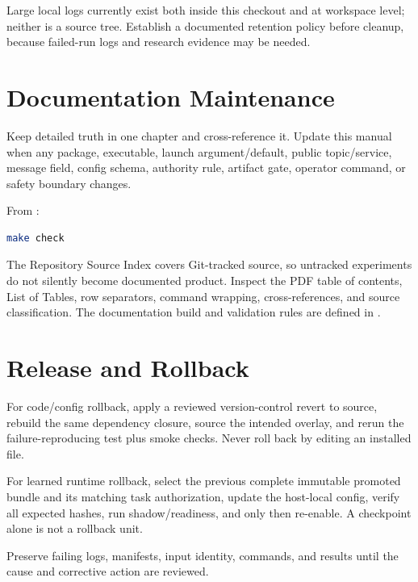 Large local logs currently exist both inside this checkout and at workspace
level; neither is a source tree. Establish a documented retention policy before
cleanup, because failed-run logs and research evidence may be needed.

\section{Documentation Maintenance}

Keep detailed truth in one chapter and cross-reference it. Update this manual
when any package, executable, launch argument/default, public topic/service,
message field, config schema, authority rule, artifact gate, operator command,
or safety boundary changes.

From :

\begin{lstlisting}[language=bash]
make check
\end{lstlisting}

The Repository Source Index covers Git-tracked source, so untracked experiments
do not silently become documented product. Inspect the PDF table of contents,
List of Tables, row separators, command wrapping, cross-references, and source
classification. The documentation build and validation rules are defined in
.

\section{Release and Rollback}

For code/config rollback, apply a reviewed version-control revert to source,
rebuild the same dependency closure, source the intended overlay, and rerun the
failure-reproducing test plus smoke checks. Never roll back by editing an
installed file.

For learned runtime rollback, select the previous complete immutable promoted
bundle and its matching task authorization, update the host-local config,
verify all expected hashes, run shadow/readiness, and only then re-enable. A
checkpoint alone is not a rollback unit.

Preserve failing logs, manifests, input identity, commands, and results until
the cause and corrective action are reviewed.
